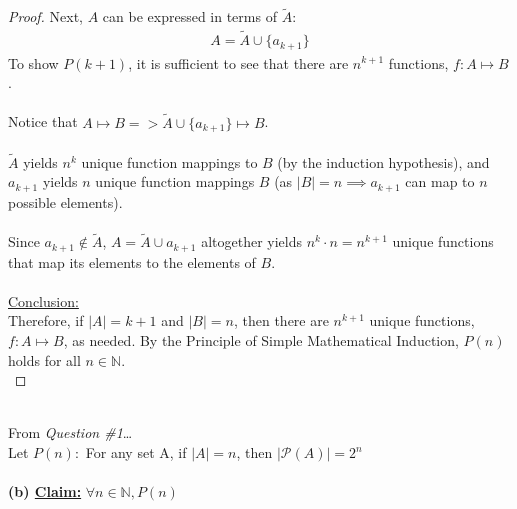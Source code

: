 \documentclass[12pt]{article}
\begin{document}
\begin{proof}
    Next, $A$ can be expressed in terms of $\widetilde{A}$:
    \begin{equation*}
        \begin{aligned}
            A = \widetilde{A} \cup \{a_{k+1}\}
        \end{aligned}
    \end{equation*}
    To show $P(k+1)$, it is sufficient to see that there are $n^{k+1}$ functions, $f: A \mapsto B$. \\
    \\
    Notice that $A \mapsto B => \widetilde{A} \cup \{a_{k+1}\} \mapsto B$. \\
    \\
    $\widetilde{A}$ yields $n^k$ unique function mappings to $B$ (by the induction hypothesis), and $a_{k+1}$ yields $n$ unique function mappings $B$ (as $|B| = n \implies a_{k+1}$ can map to $n$ possible elements). \\
    \\
    Since $a_{k+1} \notin \widetilde{A}$, $A = \widetilde{A} \cup a_{k+1}$ altogether yields $n^k \cdot n = n^{k+1}$ unique functions that map its elements to the elements of $B$. \\
    \\
    \underline{Conclusion:} \\
    Therefore, if $|A| = k + 1$ and $|B| = n$, then there are $n^{k+1}$ unique functions, $f: A \mapsto B$, as needed. By the Principle of Simple Mathematical Induction, $P(n)$ holds for all $n \in \mathbb{N}$. \\
\end{proof}
\leavevmode\\
From \textit{Question \#1}\dots \\
Let $P(n):$ For any set A, if $|A| = n$, then $|\mathcal{P}(A)| = 2^n$ \\
\\
\textbf{(b) \underline{Claim:}} $\forall n \in \mathbb{N}, P(n)$
\end{document}
